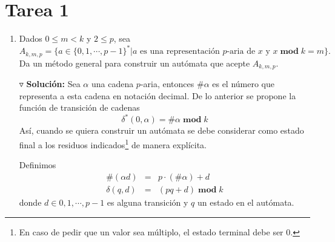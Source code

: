 \documentclass{article}
\begin{document}
\section*{\LARGE{Tarea 1}}
\begin{enumerate}
\item Dados $0 \leq m < k$ y $2 \leq p$, sea
  \[
  A_{k, m, p} = \{a \in \{0, 1, \dotsm, p-1\}^{*} | a
  \text{ es una representación $p$-aria de $x$ y $x\; \mathbf{mod}\; k = m$}\}.
  \]
  Da un método general para construir un autómata que acepte $A_{k, m, p}$.
  
  $\triangledown$ \textbf{Solución:}
  Sea $\alpha$ una cadena $p$-aria, entonces $\#\alpha$ es el
  número que representa a esta cadena en notación decimal. De
  lo anterior se propone la función de transición de cadenas
  \[
  \delta^{*}(0, \alpha) = \#\alpha\; \mathbf{mod}\; k
  \]
  Así, cuando se quiera construir un aut\'omata se debe considerar
  como estado final a los residuos indicados\footnote{En caso de
  pedir que un valor sea m\'ultiplo, el estado terminal debe ser $0$.}
  de manera explícita.
  
  Definimos
  \begin{eqnarray*}
    \#(\alpha d) &=& p \cdot (\#\alpha) + d\\
    \delta(q, d) &=& (pq + d)\; \mathbf{mod}\; k
  \end{eqnarray*}
  donde $d\in{0,1, \dotsm, p - 1}$ es alguna transición y $q$ un estado
  en el autómata.


\end{enumerate}
\end{document}
